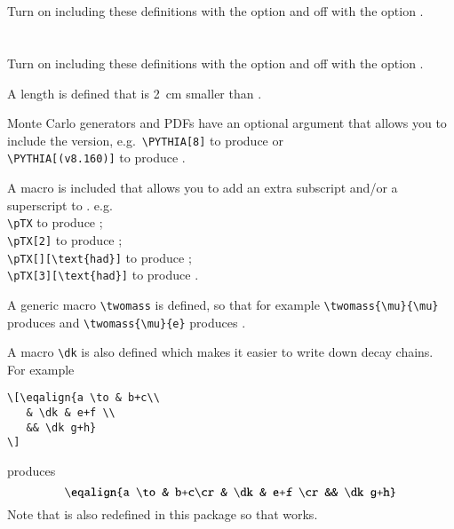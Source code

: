 \newpage
\section{}

Turn on including these definitions with the option  and off with the option .




\newpage
\section{}

Turn on including these definitions with the option  and off with the option .



\noindent A length  is defined that is \SI{2}{\cm} smaller than .

\noindent Monte Carlo generators and PDFs have an optional argument
that allows you to include the version, e.g.\
\verb|\PYTHIA[8]| to produce \PYTHIA[8] or\\
\verb|\PYTHIA[(v8.160)]| to produce \PYTHIA[(v8.160)].

\noindent A macro  is included that allows you to add an extra subscript and/or a superscript to \pT.
e.g.\\
\verb|\pTX| to produce \pTX;\\
\verb|\pTX[2]| to produce \pTX[2];\\
\verb|| to produce \pTX[][\text{had}];\\
\verb|| to produce \pTX[3][\text{had}].

\noindent A generic macro \verb|\twomass| is defined, so that for example
\verb|\twomass{\mu}{\mu}| produces \twomass{\mu}{\mu} and \verb|| produces \twomass{\mu}{e}.

A macro \verb|\dk| is also defined which makes it easier to write down decay chains.
For example
\begin{verbatim}
\[\eqalign{a \to & b+c\\
   & \dk & e+f \\
   && \dk g+h}
\]
\end{verbatim}
produces
\[\eqalign{a \to & b+c\cr
   & \dk & e+f \cr
   && \dk g+h}
\]
Note that  is also redefined in this package so that  works.


